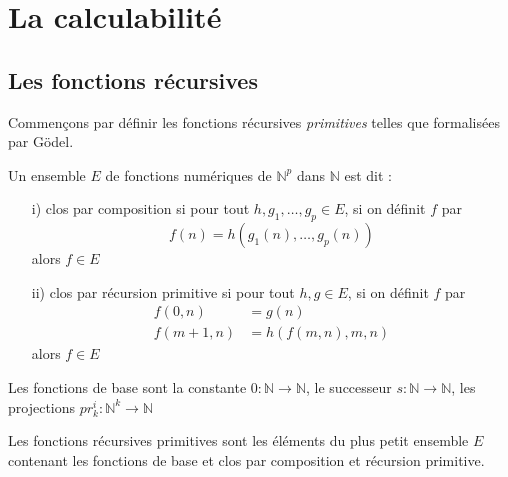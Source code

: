 \documentclass[11pt]{book}
\begin{document}
\chapter{La calculabilité}

\section{Les fonctions récursives}
Commençons  par définir les fonctions récursives \textit{primitives} telles que formalisées par
Gödel.

Un ensemble $E$ de fonctions numériques de $\mathbb{N}^p$ dans $\mathbb{N}$ est dit :
\begin{itemize}
	\item [i)] clos par composition si pour tout $h, g_1, \dots,g_p \in E$, si on définit $f$ par
	 $$f(n)=h(g_1(n), \dots, g_p(n))$$
	alors $f \in E$
	\item [ii)] clos par récursion primitive si pour tout $h,g \in E$, si on définit $f$ par
	\begin{align*}
	f(0,n) &= g(n) \\
	f(m+1, n) &= h(f(m,n),m,n)
\end{align*}
alors $f \in E$
\end{itemize}
Les fonctions de base sont la constante $0 : \mathbb{N} \rightarrow \mathbb{N}$, le successeur 
$s :\mathbb{N} \rightarrow \mathbb{N}$, les projections $pr_k^i : \mathbb{N}^k \rightarrow \mathbb{N}$

Les fonctions récursives primitives sont les éléments du plus petit ensemble $E$ contenant les
fonctions de base et clos par composition et récursion primitive.
\end{document}
